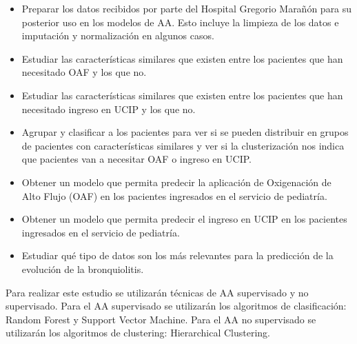 \begin{itemize}
    \item Preparar los datos recibidos por parte del Hospital Gregorio Marañón para su posterior uso en los modelos de AA. Esto incluye la limpieza de los datos e imputación y normalización en algunos casos. 
    \item Estudiar las características similares que existen entre los pacientes que han necesitado OAF y los que no.
    \item Estudiar las características similares que existen entre los pacientes que han necesitado ingreso en UCIP y los que no.
    \item Agrupar y clasificar a los pacientes para ver si se pueden distribuir en grupos de pacientes con características similares y ver si la clusterización nos indica que pacientes van a necesitar OAF o ingreso en UCIP.
    \item Obtener un modelo que permita predecir la aplicación de Oxigenación de Alto Flujo (OAF) en los pacientes ingresados en el servicio de pediatría.
    \item Obtener un modelo que permita predecir el ingreso en UCIP en los pacientes ingresados en el servicio de pediatría.
    \item Estudiar qué tipo de datos son los más relevantes para la predicción de la evolución de la bronquiolitis.
\end{itemize}


Para realizar este estudio se utilizarán técnicas de AA supervisado y no supervisado. Para el AA supervisado se utilizarán los algoritmos de clasificación: Random Forest y Support Vector Machine. Para el AA no supervisado se utilizarán los algoritmos de clustering: Hierarchical Clustering.

